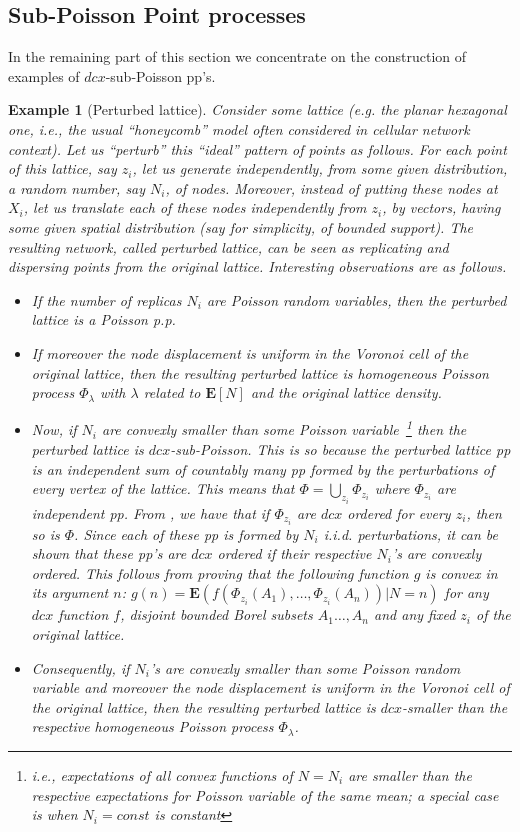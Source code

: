 \documentclass[conference]{IEEEtran}
\newtheorem{ex}[Th]{Example}
\begin{document}
\subsection{Sub-Poisson Point processes}
\label{ss.examples}
In the remaining part of this section we concentrate on 
the construction of examples of  $dcx$-sub-Poisson pp's.
\begin{ex}[Perturbed lattice]
Consider some lattice (e.g. the planar hexagonal one, 
i.e., the  usual  ``honeycomb'' model
often considered in cellular network context).
Let us ``perturb'' this ``ideal'' pattern of points as follows.
For each point of this lattice, say $z_i$, let us 
generate independently, from some given distribution, a random number,
say $N_i$, of nodes.  Moreover, instead of putting these nodes at
$X_i$, let us translate each of these nodes  
independently from $z_i$, by  vectors,  having 
some given spatial distribution (say for simplicity, of bounded support).
The resulting network, called {\em perturbed lattice},
can be seen as {\em replicating and
dispersing points from the original lattice}.
Interesting observations are as follows.
\begin{itemize}
\item
If the number of replicas $N_i$ are Poisson random variables, then the
perturbed lattice is a Poisson p.p. 
\item If moreover  the node displacement is uniform 
in the Voronoi cell of the original lattice, then the resulting
perturbed  lattice is  homogeneous Poisson
process $\Phi_\lambda$ with $\lambda$ related to ${{\mathbf E}}[N]$ and the
original lattice  density.
\item Now, if $N_i$ are convexly
smaller than some Poisson variable~\footnote{i.e., expectations of all convex
functions of $N=N_i$ are smaller than the respective expectations for
Poisson variable of the same mean; a
 special case is when $N_i=const$ is constant} 
then  the perturbed lattice is
$dcx$-sub-Poisson. This is so because the perturbed lattice pp is an
independent sum of countably many pp formed by the perturbations of
every vertex of the lattice. This means that $\Phi = \bigcup_{z_i} \Phi_{z_i}$ 
where $\Phi_{z_i}$ are independent pp. From \cite[Proposition. 3.2]{snorder}, 
we have that if $\Phi_{z_i}$ are $dcx$ ordered for every $z_i$, 
then so is $\Phi$. 
Since each of these pp is formed by $N_i$ i.i.d. perturbations, it can be shown that these pp's are $dcx$ ordered
if their respective $N_i$'s are convexly ordered. 
This follows from proving that the following function $g$ is 
convex in its argument $n$: $g(n) = {{\mathbf E}}(f(\Phi_{z_i}(A_1),\ldots,\Phi_{z_i}(A_n))| N = n)$ for any $dcx$ function $f$, disjoint bounded Borel subsets $A_1\ldots,A_n$ and
any fixed $z_i$ of the original lattice. 
\item  Consequently, if $N_i$'s are convexly smaller than some 
Poisson random variable
and  moreover the node displacement is uniform 
in the Voronoi cell of the original lattice, then the resulting
perturbed  lattice is $dcx$-smaller than the respective homogeneous Poisson
process $\Phi_\lambda$.
\end{itemize}
\end{ex}
\end{document}
